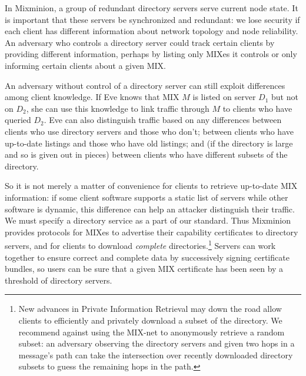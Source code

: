 \documentclass{llncs}
\begin{document}

In Mixminion, a group of redundant directory servers serve current
node state.  It is important that these servers be synchronized and
redundant:  we lose security if each client has different information
about network topology and node reliability. An adversary who controls
a directory server could track certain clients by providing different
information, perhaps by listing only MIXes it controls or only
informing certain clients about a given MIX.

An adversary without control of a directory server can still exploit
differences among client knowledge. If Eve knows that MIX $M$ is listed
on server $D_1$ but not on $D_2$, she can use this knowledge to link
traffic through $M$ to clients who have queried $D_2$.  Eve can also
distinguish traffic based on any differences between clients who use
directory servers and those who don't; between clients who have up-to-date
listings and those who have old listings; and (if the directory is large
and so is given out in pieces) between clients who have different subsets
of the directory.

So it is not merely a matter of convenience for clients to retrieve
up-to-date MIX information: if some client software supports a static
list of servers while other software is dynamic, this difference can
help an attacker distinguish their traffic. We must specify a directory
service as a part of our standard. Thus Mixminion provides protocols for
MIXes to advertise their capability certificates to directory servers,
and for clients to download \emph{complete} directories.\footnote{
  New advances in Private Information Retrieval \cite{malkin-thesis}
  may down 
  the
  road allow clients to efficiently and privately download a subset of
  the directory. We recommend against using the MIX-net to anonymously
  retrieve a random subset: an adversary observing the directory servers
  and given two hops in a message's path can take the intersection over
  recently downloaded directory subsets to guess the remaining hops in
  the path.}
Servers can work together to ensure correct and complete data by
successively signing certificate bundles, so users can be sure that a
given MIX certificate has been seen by a threshold of directory servers.
\end{document}
